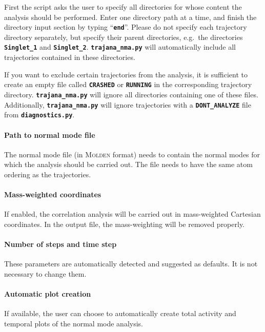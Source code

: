 \documentclass[a4paper,10pt,DIV=15,openany]{scrbook}
\newcommand{\ttt}[1]{\textbf{\texttt{#1}}}
\begin{document}
First the script asks the user to specify all directories for whose content the analysis should be performed. Enter one directory path at a time, and finish the directory input section by typing ``\ttt{end}''. Please do not specify each trajectory directory separately, but specify their parent directories, e.g.\ the directories \ttt{Singlet\_1} and \ttt{Singlet\_2}. \ttt{trajana\_nma.py} will automatically include all trajectories contained in these directories.

If you want to exclude certain trajectories from the analysis, it is sufficient to create an empty file called \ttt{CRASHED} or \ttt{RUNNING} in the corresponding trajectory directory. \ttt{trajana\_nma.py} will ignore all directories containing one of these files.
Additionally, \ttt{trajana\_nma.py} will ignore trajectories with a \ttt{DONT\_ANALYZE} file from \ttt{diagnostics.py}.

\paragraph{Path to normal mode file}

The normal mode file (in \textsc{Molden} format) needs to contain the normal modes for which the analysis should be carried out.
The file needs to have the same atom ordering as the trajectories.

\paragraph{Mass-weighted coordinates}

If enabled, the correlation analysis will be carried out in mass-weighted Cartesian coordinates.
In the output file, the mass-weighting will be removed properly.

\paragraph{Number of steps and time step}

These parameters are automatically detected and suggested as defaults.
It is not necessary to change them.

\paragraph{Automatic plot creation}

If available, the user can choose to automatically create total activity and temporal plots of the normal mode analysis.
\end{document}
